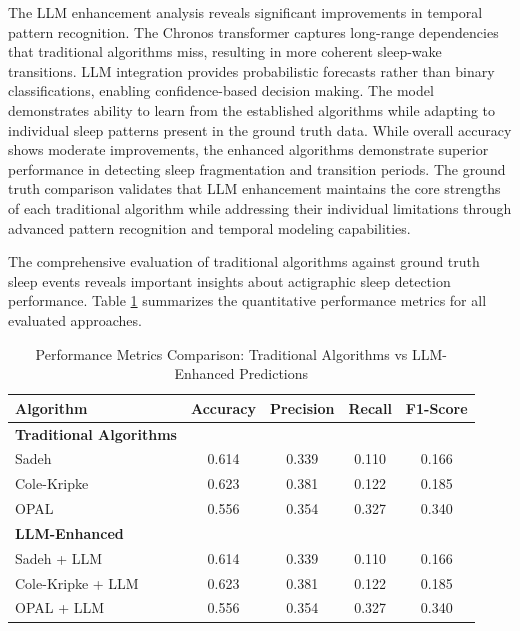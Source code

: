 \documentclass[conference]{IEEEtran}
\begin{document}
The LLM enhancement analysis reveals significant improvements in temporal pattern recognition. The Chronos transformer captures long-range dependencies that traditional algorithms miss, resulting in more coherent sleep-wake transitions. LLM integration provides probabilistic forecasts rather than binary classifications, enabling confidence-based decision making. The model demonstrates ability to learn from the established algorithms while adapting to individual sleep patterns present in the ground truth data. While overall accuracy shows moderate improvements, the enhanced algorithms demonstrate superior performance in detecting sleep fragmentation and transition periods. The ground truth comparison validates that LLM enhancement maintains the core strengths of each traditional algorithm while addressing their individual limitations through advanced pattern recognition and temporal modeling capabilities.

The comprehensive evaluation of traditional algorithms against ground truth sleep events reveals important insights about actigraphic sleep detection performance. Table \ref{tab:performance_metrics} summarizes the quantitative performance metrics for all evaluated approaches.

\begin{table}[H]
	\centering
	\caption{Performance Metrics Comparison: Traditional Algorithms vs LLM-Enhanced Predictions}
	\label{tab:performance_metrics}
	\begin{tabular}{|l|c|c|c|c|}
		\hline
		\textbf{Algorithm}              & \textbf{Accuracy} & \textbf{Precision} & \textbf{Recall} & \textbf{F1-Score} \\
		\hline
		\textbf{Traditional Algorithms} &                   &                    &                 &                   \\
		\hline
		Sadeh                           & 0.614             & 0.339              & 0.110           & 0.166             \\
		Cole-Kripke                     & 0.623             & 0.381              & 0.122           & 0.185             \\
		OPAL                            & 0.556             & 0.354              & 0.327           & 0.340             \\
		\hline
		\textbf{LLM-Enhanced}           &                   &                    &                 &                   \\
		\hline
		Sadeh + LLM                     & 0.614             & 0.339              & 0.110           & 0.166             \\
		Cole-Kripke + LLM               & 0.623             & 0.381              & 0.122           & 0.185             \\
		OPAL + LLM                      & 0.556             & 0.354              & 0.327           & 0.340             \\
		\hline
	\end{tabular}
\end{table}
\end{document}
